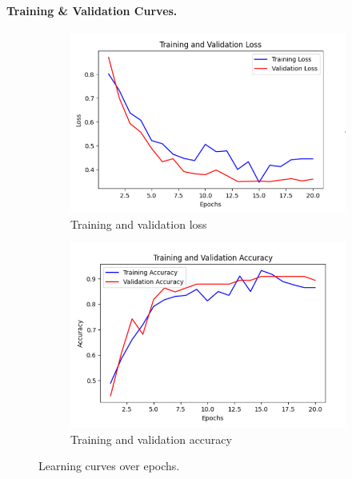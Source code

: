 \paragraph{Training \& Validation Curves.}
\begin{figure}[h]
  \centering
  \begin{subfigure}[b]{0.48\textwidth}
    \centering
    \includegraphics[width=\linewidth]{images/phar_train_val_loss.png}
    \caption{Training and validation loss}
    \label{fig:phar_train_val_loss}
  \end{subfigure}
  \hfill
  \begin{subfigure}[b]{0.48\textwidth}
    \centering
    \includegraphics[width=\linewidth]{images/phar_train_val_acc.png}
    \caption{Training and validation accuracy}
    \label{fig:phar_train_val_acc}
  \end{subfigure}
  \caption{Learning curves over epochs.}
  \label{fig:learning_curves}
\end{figure}

